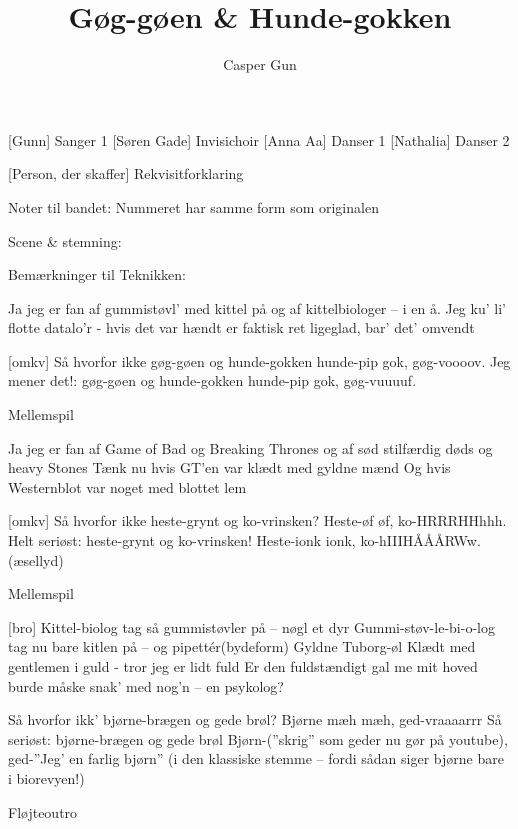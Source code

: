 \documentclass[a4paper,11pt]{article}
\title{Gøg-gøen \& Hunde-gokken}
\author{Casper Gun}
\begin{document}
\maketitle

\begin{roles}
    [Gunn] Sanger 1
    [Søren Gade] Invisichoir 
    [Anna Aa] Danser 1
    [Nathalia] Danser 2
\end{roles}

\begin{props}
    [Person, der skaffer] Rekvisitforklaring
\end{props}

\scene
Noter til bandet:
Nummeret har samme form som originalen


Scene \& stemning:


Bemærkninger til Teknikken:



\begin{song}
Ja jeg er fan af gummistøvl'
med kittel på
og af kittelbiologer – i en å.
Jeg ku' li' flotte datalo'r
- hvis det var hændt 
er faktisk ret ligeglad, bar' det' omvendt

[omkv]
Så hvorfor ikke
gøg-gøen og hunde-gokken
hunde-pip gok, gøg-voooov.
Jeg mener det!: gøg-gøen og hunde-gokken
hunde-pip gok, gøg-vuuuuf.

\scene Mellemspil

Ja jeg er fan af Game of Bad
og Breaking Thrones
og af sød stilfærdig døds og heavy Stones
Tænk nu hvis GT'en var klædt med gyldne mænd
Og hvis Westernblot var noget med blottet lem

[omkv]
Så hvorfor ikke
heste-grynt og ko-vrinsken?
Heste-øf øf, ko-HRRRHHhhh.
Helt seriøst: heste-grynt og ko-vrinsken!
Heste-ionk ionk, ko-hIIIHÅÅÅRWw. (æsellyd)

\scene Mellemspil

[bro]
Kittel-biolog
tag så gummistøvler på – nøgl et dyr
Gummi-støv-le-bi-o-log
tag nu bare kitlen på – og pipettér(bydeform)
Gyldne Tuborg-øl 
Klædt med gentlemen i guld - tror jeg er lidt fuld
Er den fuldstændigt gal me mit hoved
burde måske snak' med nog'n – en psykolog?


Så hvorfor ikk'
bjørne-brægen og gede brøl?
Bjørne mæh mæh,  ged-vraaaarrr
Så seriøst: bjørne-brægen og gede brøl
Bjørn-(”skrig” som geder nu gør på youtube), ged-”Jeg' en farlig bjørn” (i den klassiske stemme – fordi sådan siger bjørne bare i biorevyen!)

\scene Fløjteoutro
\end{song}
\end{document}
